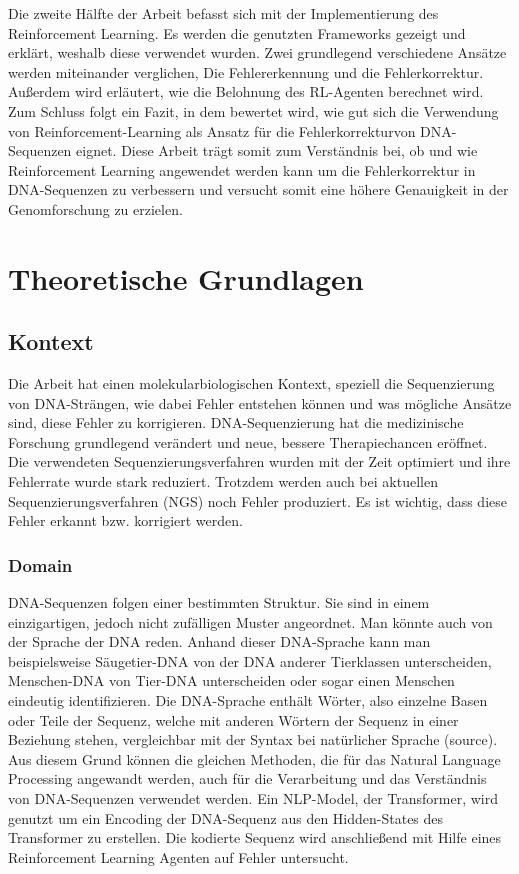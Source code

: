 \documentclass[oneside,bibliography=totocnumbered,BCOR=5mm]{scrbook}%
\theoremstyle{definition}
\theoremstyle{definition}
\theoremstyle{definition}
\theoremstyle{definition}
\theoremstyle{definition}
\theoremstyle{definition}
\begin{document}
Die zweite Hälfte der Arbeit befasst sich mit der Implementierung des Reinforcement Learning.
Es werden die genutzten Frameworks gezeigt und erklärt, weshalb diese verwendet wurden.
Zwei grundlegend verschiedene Ansätze werden miteinander verglichen, Die Fehlererkennung und die Fehlerkorrektur.
Außerdem wird erläutert, wie die Belohnung des RL-Agenten berechnet wird. \\


Zum Schluss folgt ein Fazit, in dem bewertet wird, wie gut sich die Verwendung von Reinforcement-Learning 
als Ansatz für die Fehlerkorrekturvon DNA-Sequenzen eignet. Diese Arbeit trägt somit zum Verständnis bei, ob und wie Reinforcement Learning angewendet werden kann um die Fehlerkorrektur in 
DNA-Sequenzen zu verbessern und versucht somit eine höhere Genauigkeit in der Genomforschung zu erzielen.


\chapter{Theoretische Grundlagen}

\section{Kontext}

Die Arbeit hat einen molekularbiologischen Kontext, speziell die Sequenzierung von DNA-Strängen, 
wie dabei Fehler entstehen können und was mögliche Ansätze sind, diese Fehler zu korrigieren.
DNA-Sequenzierung hat die medizinische Forschung grundlegend verändert und neue, bessere Therapiechancen eröffnet. 
Die verwendeten Sequenzierungsverfahren wurden mit der Zeit optimiert und ihre Fehlerrate wurde stark reduziert. 
Trotzdem werden auch bei aktuellen Sequenzierungsverfahren (NGS) noch Fehler produziert. 
Es ist wichtig, dass diese Fehler erkannt bzw. korrigiert werden.\\

\subsection{Domain} 

DNA-Sequenzen folgen einer bestimmten Struktur. Sie sind in einem einzigartigen, jedoch nicht zufälligen Muster angeordnet. 
Man könnte auch von der Sprache der DNA reden. 
Anhand dieser DNA-Sprache kann man beispielsweise Säugetier-DNA von der DNA anderer Tierklassen unterscheiden, 
Menschen-DNA von Tier-DNA unterscheiden oder sogar einen Menschen eindeutig identifizieren.
Die DNA-Sprache enthält Wörter, also einzelne Basen oder Teile der Sequenz, welche mit anderen Wörtern der Sequenz in einer Beziehung stehen, vergleichbar mit der Syntax bei natürlicher Sprache (source).
Aus diesem Grund können die gleichen Methoden, die für das Natural Language Processing angewandt werden, auch für die Verarbeitung und das Verständnis von DNA-Sequenzen verwendet werden.
Ein NLP-Model, der Transformer, wird genutzt um ein Encoding der DNA-Sequenz aus den Hidden-States des Transformer zu erstellen. 
Die kodierte Sequenz wird anschließend mit Hilfe eines Reinforcement Learning Agenten auf Fehler untersucht. \\
\end{document}
